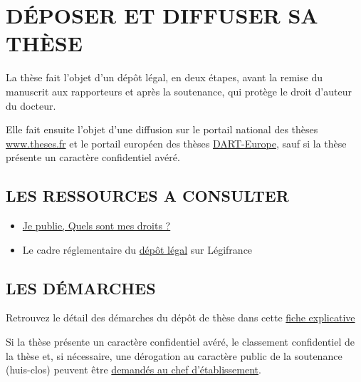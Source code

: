 \chapter{DÉPOSER ET DIFFUSER SA THÈSE}
La thèse fait l’objet d’un dépôt légal, en deux étapes, avant la remise du manuscrit aux rapporteurs et après la soutenance, qui protège le droit d’auteur du docteur.\\ \par 
Elle fait ensuite l’objet d’une diffusion sur le portail national des thèses \url{www.theses.fr} et le portail européen des thèses \href{https://www.dart-europe.org/basic-search.php}{DART-Europe}, sauf si la thèse présente un caractère confidentiel avéré.
\section{LES RESSOURCES A CONSULTER}

\begin{itemize}
\renewcommand{\labelitemi}{$\bullet$}
\item \href{http://corist-shs.cnrs.fr/sites/default/files/ressources/droit_auteur_lecture_vf.pdf}{Je publie, Quels sont mes droits ?}
\item Le cadre réglementaire du \href{https://www.legifrance.gouv.fr/codes/article_lc/LEGIARTI000006845515/}{dépôt légal} sur Légifrance
\end{itemize}

\section{LES DÉMARCHES}
Retrouvez le détail des démarches du dépôt de thèse dans cette \href{https://www.universite-paris-saclay.fr/sites/default/files/2021-12/fiche-depot-legal-these-2021_0.pdf}{fiche explicative}\\ \par
Si la thèse présente un caractère confidentiel avéré, le classement confidentiel de la thèse et, si nécessaire, une dérogation au caractère public de la soutenance (huis-clos) peuvent être \href{https://www.universite-paris-saclay.fr/research/doctorate/quality-assurance-documents/documents-de-reference-relatifs-la-soutenance-de-la-these}{demandés au chef d’établissement}.
